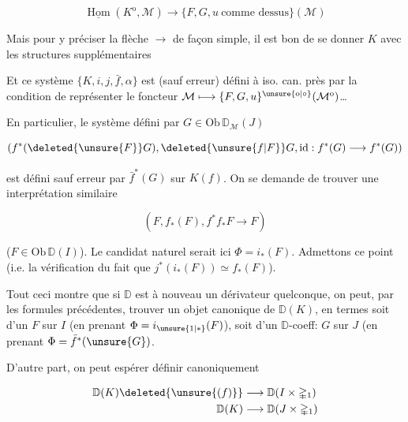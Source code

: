 
\[
\underline{\operatorname{Hom}}(K^{\mathrm o},\mathcal M)\longrightarrow
\{F,G,u\ \text{comme dessus}\}(\mathcal M)
\]

Mais pour y préciser la flèche $\longrightarrow$ de façon  simple, il est bon de se donner $K$ avec les structures supplémentaires


Et ce système
$\{K,i,j,\bar f,\alpha\}$ est (sauf erreur) défini à iso. can. près par la condition de représenter le foncteur $\mathcal M\longmapsto\{F,G,u\}^{\unsure{\mathrm o|\circ}}(\mathcal M^{\mathrm o})$\ldots

En particulier, le système défini par $G\in\mathrm{Ob}\,\mathbb D_{\mathcal M}(J)$

\[
(f^*(\deleted{\unsure{F}}G),\deleted{\unsure{f|F}}G,\mathrm{id}:f^*(G)\longrightarrow f^*(G))
\]

est défini sauf erreur par $\bar f^*(G)$ sur $K(f)$. On se demande de trouver une interprétation similaire 

\[
(F,f_*(F),f^*f_*F\longrightarrow F)
\]

($F\in\mathrm{Ob}\,\mathbb D(I)$). Le candidat naturel serait ici $\Phi=i_*(F)$. Admettons ce point (i.e.  la vérification du fait que $j^*(i_*(F))\simeq f_*(F)$).

Tout ceci montre que si $\mathbb D$ est à nouveau un dérivateur quelconque, on peut, par les formules précédentes, trouver un objet canonique \inserted{$\Phi$} de $\mathbb D(K)$, en termes soit d'un  $F$ sur $I$ (en prenant $\Phi=i_{\unsure{1|*}}(F)$), soit d'un $\mathbb D$-coeff: $G$ sur $J$ (en prenant $\Phi=\bar f^*(\unsure{G})$.

D'autre part, on peut espérer définir canoniquement

\[
\begin{aligned}
\mathbb D(K)\deleted{\unsure{(f)}}&\longrightarrow\mathbb D(I\times\mathbb{\Delta}_1)\\
\mathbb D(K)&\longrightarrow\mathbb D(J\times\mathbb{\Delta}_1)
\end{aligned}
\]

